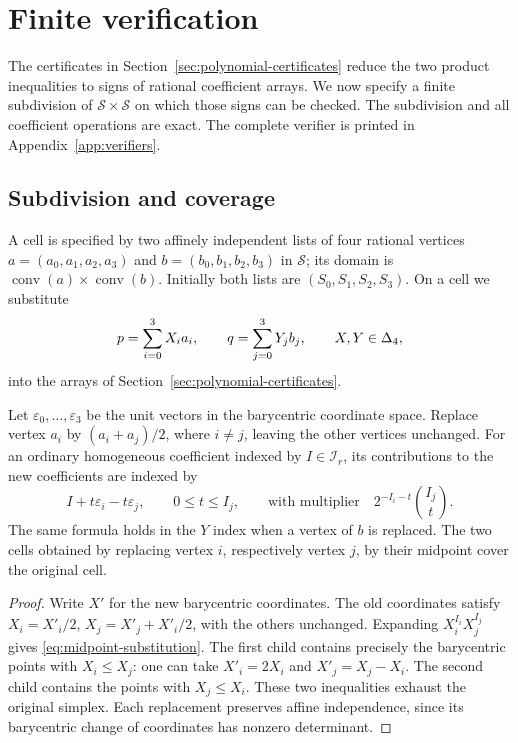 \section{Finite verification}\label{sec:finite-verification}

The certificates in Section~\ref{sec:polynomial-certificates} reduce the two
product inequalities to signs of rational coefficient arrays.  We now specify
a finite subdivision of $\mathcal S\times\mathcal S$ on which those signs can
be checked.  The subdivision and all coefficient operations are exact.  The
complete verifier is printed in Appendix~\ref{app:verifiers}.

\subsection{Subdivision and coverage}

A cell is specified by two affinely independent lists of four rational vertices
$a=(a_0,a_1,a_2,a_3)$ and $b=(b_0,b_1,b_2,b_3)$ in $\mathcal S$; its domain is
$\operatorname{conv}(a)\times\operatorname{conv}(b)$.  Initially both lists
are $(S_0,S_1,S_2,S_3)$.  On a cell we substitute
\[
 p=\sum_{i=0}^3X_i a_i,\qquad q=\sum_{j=0}^3Y_j b_j,
 \qquad X,Y\in\Delta_4,
\]
into the arrays of Section~\ref{sec:polynomial-certificates}.

\begin{lemma}\label{lem:subdivision}
Let $\varepsilon_0,\ldots,\varepsilon_3$ be the unit vectors in the
barycentric coordinate space.  Replace vertex $a_i$ by $(a_i+a_j)/2$, where
$i\ne j$, leaving the other vertices unchanged.  For an ordinary homogeneous coefficient indexed by
$I\in\mathcal I_r$, its contributions to the new coefficients are indexed by
\begin{equation}\label{eq:midpoint-substitution}
 I+t\varepsilon_i-t\varepsilon_j,\qquad 0\le t\le I_j,
 \qquad\text{with multiplier}\quad
 2^{-I_i-t}\binom{I_j}{t}.
\end{equation}
The same formula holds in the $Y$ index when a vertex of $b$ is replaced.
The two cells obtained by replacing vertex $i$, respectively vertex $j$,
by their midpoint cover the original cell.
\end{lemma}

\begin{proof}
Write $X'$ for the new barycentric coordinates.  The old coordinates satisfy
$X_i=X'_i/2$, $X_j=X'_j+X'_i/2$, with the others unchanged.  Expanding
$X_i^{I_i}X_j^{I_j}$ gives \eqref{eq:midpoint-substitution}.  The first child
contains precisely the barycentric points with $X_i\le X_j$: one can take
$X'_i=2X_i$ and $X'_j=X_j-X_i$.  The second child contains the points with
$X_j\le X_i$.  These two inequalities exhaust the original simplex.
Each replacement preserves affine independence, since its barycentric
change of coordinates has nonzero determinant.
\end{proof}

